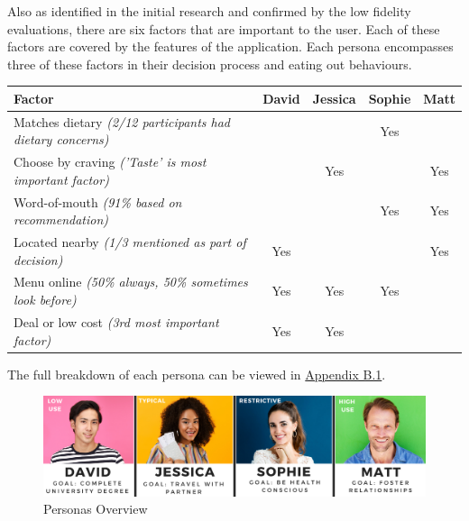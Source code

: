 \documentclass[a4 paper, 12pt]{article}
\begin{document}
    Also as identified in the initial research and confirmed by the low fidelity evaluations, there are six factors that are important to the user. Each of these factors are covered by the features of the application. Each persona encompasses three of these factors in their decision process and eating out behaviours.
    \begin{center}
    \begin{tabular}{|l|c|c|c|c|}   
        \hline  
        Factor                                                          & David & Jessica& Sophie   & Matt \\
        \hline \hline
        Matches dietary \textit{(2/12 participants had dietary concerns)}&      &       & Yes       &   \\
        \hline
        Choose by craving \textit{('Taste' is most important factor)}   &       & Yes   &           & Yes \\ 
        \hline
        Word-of-mouth \textit{(91\% based on recommendation)}           &       &       & Yes       & Yes \\ 
        \hline
        Located nearby \textit{(1/3 mentioned as part of decision)}     & Yes   &       &           & Yes \\ 
        \hline
        Menu online \textit{(50\% always, 50\% sometimes look before)}  & Yes   & Yes   & Yes       &  \\
        \hline
        Deal or low cost \textit{(3rd most important factor)}           & Yes   & Yes   &           &  \\
        \hline
        \end{tabular}
    \end{center}
    
    The full breakdown of each persona can be viewed in \hyperref[sec:B.1]{Appendix B.1}.
        \begin{figure} [H]
            \centering
            \includegraphics[width=\textwidth, frame]
                {./Med_Fidelity/Med_Report/images/personas_overview.PNG}  
            \caption{Personas Overview}
        \end{figure}  
\end{document}
